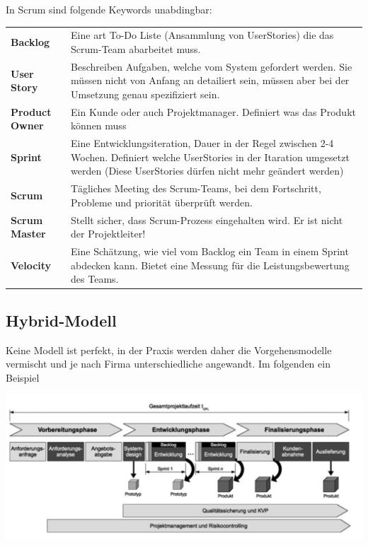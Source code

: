 In Scrum sind folgende Keywords unabdingbar:\\
\begin{tabular}{lm{6cm}}
	\textbf{Backlog} & Eine art To-Do Liste (Ansammlung von UserStories) die das Scrum-Team abarbeitet muss. \\
	\textbf{User Story} & Beschreiben Aufgaben, welche vom System gefordert werden. Sie müssen nicht von Anfang an detailiert sein, müssen aber bei der Umsetzung genau spezifiziert sein. \\
	\textbf{Product Owner} & Ein Kunde oder auch Projektmanager. Definiert was das Produkt können muss \\
	\textbf{Sprint} & Eine Entwicklungsiteration, Dauer in der Regel zwischen 2-4 Wochen. Definiert welche UserStories in der Itaration umgesetzt werden (Diese UserStories dürfen nicht mehr geändert werden) \\
	\textbf{Scrum} & Tägliches Meeting des Scrum-Teams, bei dem Fortschritt, Probleme und priorität überprüft werden.\\
	\textbf{Scrum Master} & Stellt sicher, dass Scrum-Prozess eingehalten wird. Er ist nicht der Projektleiter! \\
	\textbf{Velocity} & Eine Schätzung, wie viel vom Backlog ein Team in einem Sprint abdecken kann. Bietet eine Messung für die Leistungsbewertung des Teams.
\end{tabular}

\subsection{Hybrid-Modell}
Keine Modell ist perfekt, in der Praxis werden daher die Vorgehensmodelle vermischt und je nach Firma unterschiedliche angewandt. Im folgenden ein Beispiel
\begin{center}
	\includegraphics[width=\columnwidth]{Images/vorgehensmodell_beispiel}
\end{center}

